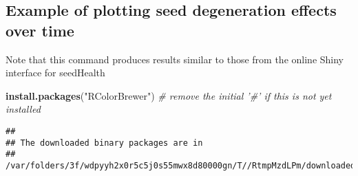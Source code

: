 \documentclass[]{article}
\newenvironment{Shaded}{\begin{snugshade}}{\end{snugshade}}
\newcommand{\KeywordTok}[1]{\textcolor[rgb]{0.13,0.29,0.53}{\textbf{#1}}}
\newcommand{\StringTok}[1]{\textcolor[rgb]{0.31,0.60,0.02}{#1}}
\newcommand{\CommentTok}[1]{\textcolor[rgb]{0.56,0.35,0.01}{\textit{#1}}}
\newcommand{\NormalTok}[1]{#1}
\begin{document}
\subsection{Example of plotting seed degeneration effects over
time}\label{example-of-plotting-seed-degeneration-effects-over-time}

Note that this command produces results similar to those from the online
Shiny interface for seedHealth

\begin{Shaded}
\begin{Highlighting}[]
\KeywordTok{install.packages}\NormalTok{(}\StringTok{"RColorBrewer"}\NormalTok{) }\CommentTok{# remove the initial '#' if this is not yet installed}
\end{Highlighting}
\end{Shaded}

\begin{verbatim}
## 
## The downloaded binary packages are in
##  /var/folders/3f/wdpyyh2x0r5c5j0s55mwx8d80000gn/T//RtmpMzdLPm/downloaded_packages
\end{verbatim}
\end{document}
